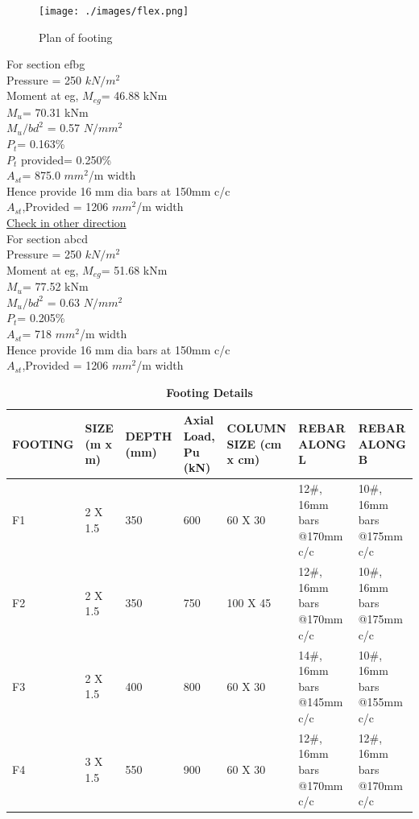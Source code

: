  	\begin{figure}[H]
 		
 		\centering
 		\texttt{[image: ./images/flex.png]}
 		\caption{Plan of footing}
 		\label{manual}
 	\end{figure}
For section efbg\\
 Pressure = 250 $kN/m^{2}$\\
 Moment at eg, $M_{eg}$= 46.88 kNm\\
 $M_u$= 70.31 kNm\\
  $M_u/bd^2$ = 0.57 $N/mm^2$\\
 $P_t$= 0.163\%\\
 $P_t$ provided= 0.250\% \\
 $A_{st}$= 875.0 $mm^2$/m width\\
 Hence provide 16 mm dia bars at 150mm c/c\\
 $A_{st}$,Provided = 1206 $mm^2$/m width\\
 \underline{Check in other direction}\\
  For section abcd\\
 Pressure = 250 $kN/m^{2}$\\
 Moment at eg, $M_{eg}$= 51.68 kNm\\
 $M_u$= 77.52 kNm\\
 $M_u/bd^2$ = 0.63 $N/mm^2$\\
 $P_t$= 0.205\%\\
 $A_{st}$= 718 $mm^2$/m width\\
 Hence provide 16 mm dia bars at 150mm c/c\\
 $A_{st}$,Provided = 1206 $mm^2$/m width\\
 
 \begin{table}[H]
 	\begin{center}
 		\caption{\bf Footing Details}
 		\label{foot}
 		\begin{tabular}{ |p{1.5cm} | p{1.5cm} | p{1.5cm} | p{1.5cm} |p{1.5cm}|p{1.5cm}|p{1.5cm}|}
 			\hline
 			\textbf{FOOTING} & \textbf{SIZE (m x m)} & \textbf{DEPTH (mm)} & \textbf{Axial Load, Pu (kN)}&\textbf{COLUMN SIZE (cm x cm)}&\textbf{REBAR ALONG L}&\textbf{REBAR ALONG B} \\ \hline
 			F1& 2 X 1.5 & 350 & 600& 60 X 30& 12\#, 16mm bars @170mm c/c & 10\#, 16mm bars @175mm c/c \\ 
 			\hline
 		 F2& 2 X 1.5 & 350 & 750& 100 X 45& 12\#, 16mm bars @170mm c/c & 10\#, 16mm bars @175mm c/c \\ 
 		 \hline
 		 F3& 2 X 1.5 & 400 & 800& 60 X 30& 14\#, 16mm bars @145mm c/c & 10\#, 16mm bars @155mm c/c \\
 		  \hline
 		 F4& 3 X 1.5 & 550 & 900& 60 X 30& 12\#, 16mm bars @170mm c/c & 12\#, 16mm bars @170mm c/c \\
 		\hline
 		\end{tabular}
 	\end{center}
 \end{table}
 

